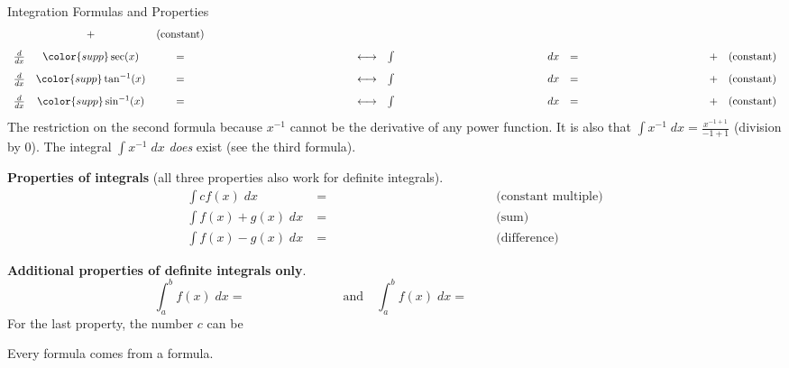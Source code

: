\documentclass[../main.tex]{subfiles}
\begin{document}
\begin{lesson}{Integration Formulas and Properties}
\[\begin{array}{rcclcrclllcl}
                   &+& (\text{constant}) \\[2ex]
      \frac{d}{dx} & {\color{supp} \sec(x)} &=& \phantom{\color{main} \tan(x)\sec(x)}
                   & \longleftrightarrow 
                   & \int & \phantom{\color{main} \tan(x)\sec(x)} & dx &=& \phantom{\color{supp} \sec(x)} 
                   &+& (\text{constant}) \\[2ex]
      \frac{d}{dx} & {\color{supp} \arctan(x)} &=& \phantom{\color{main} \frac{1}{x^{2}+1}}
                   & \longleftrightarrow 
                   & \int & \phantom{\color{main} \frac{1}{x^{2} + 1}} & dx &=& \phantom{\color{supp} \arctan(x)} 
                   &+& (\text{constant}) \\[2ex]
      \frac{d}{dx} & {\color{supp} \arcsin(x)} &=& \phantom{\color{main} \frac{1}{\sqrt{1 - x^{2}}}}
                   & \longleftrightarrow 
                   & \int & \phantom{\color{main} \frac{1}{\sqrt{1 - x^{2}}}} & dx &=& \phantom{\color{supp} \arcsin(x)} 
                   &+& (\text{constant})
    \end{array}
  \]
  {\footnotesize \faExclamationTriangle{} The restriction  on the second formula  because \(x^{-1}\) cannot be the derivative of any power function. It is also  that \(\textstyle \int x^{-1} \;dx = \frac{x^{-1 + 1}}{-1 + 1}\) (division by \(0\)). The integral \(\textstyle \int x^{-1} \;dx\) \emph{does} exist (see the third formula).}

  \textbf{Properties of integrals} (all three properties also work for definite integrals).
  \begin{align*}
    \int c f(x) \;dx 
    &= \phantom{c \int f(x) \;dx} && \text{(constant multiple)}\\
    \int f(x) + g(x) \;dx 
    &= \phantom{\int f(x) \;dx + \int g(x) \;dx} && \text{(sum)}\\
    \int f(x) - g(x) \;dx 
    &= \phantom{\int f(x) \;dx - \int g(x) \;dx} && \text{(difference)}
  \end{align*}

  \textbf{Additional properties of definite integrals only}.
  \[
    \int_{a}^{b} f(x) \;dx = \phantom{- \int_{b}^{a} f(x) \;dx}
    \quad\text{and}\quad
    \int_{a}^{b} f(x) \;dx = \phantom{\int_{a}^{c} f(x) \;dx + \int_{c}^{b} f(x) \;dx.}
  \]
  For the last property, the number \(c\) can be \underline{\hspace{4in}}
  \clearpage

  Every  formula comes from a  formula.


\end{lesson}
\end{document}

